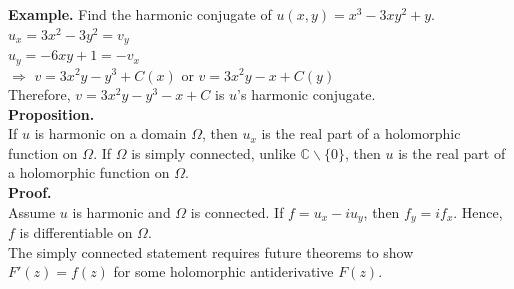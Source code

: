 \documentclass[11pt]{article}
\begin{document}
\textbf{Example.} Find the harmonic conjugate of $u(x, y) = x^3 - 3xy^2 + y$. \\
$u_x = 3x^2 - 3y^2 = v_y$ \\
$u_y = -6xy + 1 = -v_x$ \\
$\Rightarrow$ $v = 3x^2y - y^3 + C(x)$ or $v = 3x^2y - x + C(y)$ \\
Therefore, $v = 3x^2y - y^3 - x + C$ is $u$'s harmonic conjugate. \\
\newline 
\textbf{Proposition.} \\ 
If $u$ is harmonic on a domain $\Omega$, then $u_x$ is the real part of a holomorphic function on $\Omega$. If $\Omega$ is simply connected, unlike $\mathbb{C} \backslash \{0\}$, then $u$ is the real part of a holomorphic function on $\Omega$. \\
\textbf{Proof.} \\
Assume $u$ is harmonic and $\Omega$ is connected. If $f = u_x - iu_y$, then $f_y = if_x$. Hence, $f$ is differentiable on $\Omega$. \\
The simply connected statement requires future theorems to show $F'(z) = f(z)$ for some holomorphic antiderivative $F(z)$. 

\newpage
\end{document}
